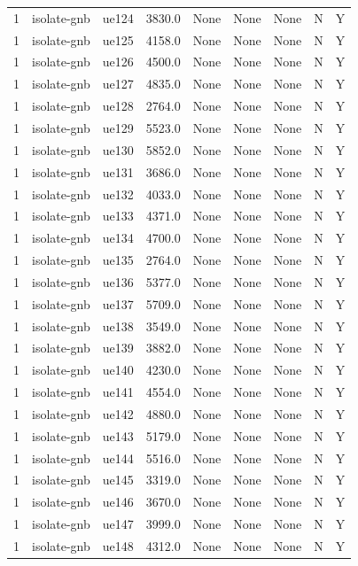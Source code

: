 \begin{table}[ht]
\begin{tabular}{|c|c|c|c|c|c|c|c|c|}
1 & isolate-gnb & ue124 & 3830.0 & None & None & None & N & Y \\
1 & isolate-gnb & ue125 & 4158.0 & None & None & None & N & Y \\
1 & isolate-gnb & ue126 & 4500.0 & None & None & None & N & Y \\
1 & isolate-gnb & ue127 & 4835.0 & None & None & None & N & Y \\
1 & isolate-gnb & ue128 & 2764.0 & None & None & None & N & Y \\
1 & isolate-gnb & ue129 & 5523.0 & None & None & None & N & Y \\
1 & isolate-gnb & ue130 & 5852.0 & None & None & None & N & Y \\
1 & isolate-gnb & ue131 & 3686.0 & None & None & None & N & Y \\
1 & isolate-gnb & ue132 & 4033.0 & None & None & None & N & Y \\
1 & isolate-gnb & ue133 & 4371.0 & None & None & None & N & Y \\
1 & isolate-gnb & ue134 & 4700.0 & None & None & None & N & Y \\
1 & isolate-gnb & ue135 & 2764.0 & None & None & None & N & Y \\
1 & isolate-gnb & ue136 & 5377.0 & None & None & None & N & Y \\
1 & isolate-gnb & ue137 & 5709.0 & None & None & None & N & Y \\
1 & isolate-gnb & ue138 & 3549.0 & None & None & None & N & Y \\
1 & isolate-gnb & ue139 & 3882.0 & None & None & None & N & Y \\
1 & isolate-gnb & ue140 & 4230.0 & None & None & None & N & Y \\
1 & isolate-gnb & ue141 & 4554.0 & None & None & None & N & Y \\
1 & isolate-gnb & ue142 & 4880.0 & None & None & None & N & Y \\
1 & isolate-gnb & ue143 & 5179.0 & None & None & None & N & Y \\
1 & isolate-gnb & ue144 & 5516.0 & None & None & None & N & Y \\
1 & isolate-gnb & ue145 & 3319.0 & None & None & None & N & Y \\
1 & isolate-gnb & ue146 & 3670.0 & None & None & None & N & Y \\
1 & isolate-gnb & ue147 & 3999.0 & None & None & None & N & Y \\
1 & isolate-gnb & ue148 & 4312.0 & None & None & None & N & Y \\

\end{tabular}
\end{table}
